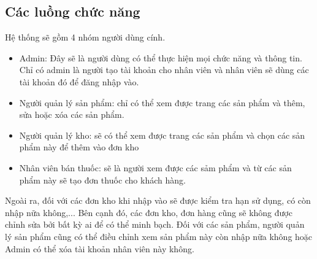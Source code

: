 \subsection{Các luồng chức năng}
Hệ thống sẽ gồm 4 nhóm người dùng cính.
\begin{itemize}
    \item Admin: Đây sẽ là người dùng có thể thực hiện mọi chức năng và thông tin. Chỉ có admin là người tạo tài khoản cho nhân viên và nhân viên sẽ dùng các tài khoản đó để đăng nhập vào.
    \item Người quản lý sản phẩm: chỉ có thể xem được trang các sản phẩm và thêm, sửa hoặc xóa các sản phẩm. 
    \item Người quản lý kho: sẽ có thể xem được trang các sản phẩm và chọn các sản phẩm này để thêm vào đơn kho
    \item Nhân viên bán thuốc: sẽ là người xem được các sảm phẩm và từ các sản phẩm này sẽ tạo đơn thuốc cho khách hàng.
\end{itemize}
Ngoài ra, đối với các đơn kho khi nhập vào sẽ được kiểm tra hạn sử dụng, có còn nhập nữa không,... Bên cạnh đó, các đơn kho, đơn hàng cũng sẽ không được chỉnh sửa bởi bất kỳ ai để có thể minh bạch. 
Đối với các sản phẩm, người quản lý sản phẩm cũng có thể điều chỉnh xem sản phẩm này còn nhập nữa không hoặc Admin có thể xóa tài khoản nhân viên này không.